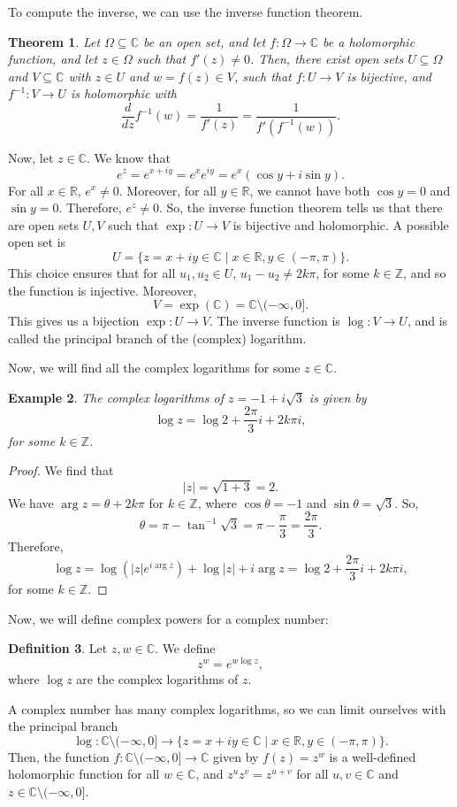 \documentclass[a4paper, openany]{memoir}
\theoremstyle{definition}
\newtheorem{definition}{Definition}[section]
\theoremstyle{plain}
\newtheorem{theorem}[definition]{Theorem}
\newtheorem{example}[definition]{Example}
\begin{document}
To compute the inverse, we can use the inverse function theorem.
\begin{theorem}
Let $\Omega \subseteq \mathbb{C}$ be an open set, and let $f: \Omega \to \mathbb{C}$ be a holomorphic function, and let $z \in \Omega$ such that $f'(z) \neq 0$. Then, there exist open sets $U \subseteq \Omega$ and $V \subseteq \mathbb{C}$ with $z \in U$ and $w = f(z) \in V$, such that $f: U \to V$ is bijective, and $f^{-1}: V \to U$ is holomorphic with
\[\frac{d}{dz} f^{-1}(w) = \frac{1}{f'(z)} = \frac{1}{f'(f^{-1}(w))}.\]
\end{theorem}
\noindent Now, let $z \in \mathbb{C}$. We know that
\[e^z = e^{x + iy} = e^x e^{iy} = e^x (\cos y + i \sin y).\]
For all $x \in \mathbb{R}$, $e^x \neq 0$. Moreover, for all $y \in \mathbb{R}$, we cannot have both $\cos y = 0$ and $\sin y = 0$. Therefore, $e^z \neq 0$. So, the inverse function theorem tells us that there are open sets $U, V$ such that $\exp: U \to V$ is bijective and holomorphic. A possible open set is
\[U = \{z = x + iy \in \mathbb{C} \mid x \in \mathbb{R}, y \in (-\pi, \pi)\}.\]
This choice ensures that for all $u_1, u_2 \in U$, $u_1 - u_2 \neq 2k\pi$, for some $k \in \mathbb{Z}$, and so the function is injective. Moreover,
\[V = \exp(\mathbb{C}) = \mathbb{C} \setminus (-\infty, 0].\]
This gives us a bijection $\exp: U \to V$. The inverse function is $\log: V \to U$, and is called the principal branch of the (complex) logarithm.

Now, we will find all the complex logarithms for some $z \in \mathbb{C}$.
\begin{example}
The complex logarithms of $z = -1 + i\sqrt{3}$ is given by
\[\log z = \log 2 + \frac{2\pi}{3}i + 2k\pi i,\]
for some $k \in \mathbb{Z}$.
\end{example}
\begin{proof}
We find that
\[|z| = \sqrt{1 + 3} = 2.\]
We have $\arg z = \theta + 2k \pi$ for $k \in \mathbb{Z}$, where $\cos \theta = -1$ and $\sin \theta = \sqrt{3}$. So,
\[\theta = \pi - \tan^{-1} \sqrt{3} = \pi - \frac{\pi}{3} = \frac{2\pi}{3}.\]
Therefore,
\[\log z = \log (|z| e^{i \arg z}) + \log |z| + i \arg z = \log 2 + \frac{2\pi}{3} i + 2k \pi i,\]
for some $k \in \mathbb{Z}$.
\end{proof}

Now, we will define complex powers for a complex number:
\begin{definition}
Let $z, w \in \mathbb{C}$. We define 
\[z^w = e^{w \log z},\]
where $\log z$ are the complex logarithms of $z$.
\end{definition}
\noindent A complex number has many complex logarithms, so we can limit ourselves with the principal branch
\[\log: \mathbb{C} \setminus (-\infty, 0] \to \{z = x + iy \in \mathbb{C} \mid x \in \mathbb{R}, y \in (-\pi, \pi)\}.\]
Then, the function $f: \mathbb{C} \setminus (-\infty, 0] \to \mathbb{C}$ given by $f(z) = z^w$ is a well-defined holomorphic function for all $w \in \mathbb{C}$, and $z^u z^v = z^{u + v}$ for all $u, v \in \mathbb{C}$ and $z \in \mathbb{C} \setminus (-\infty, 0]$.
\end{document}
